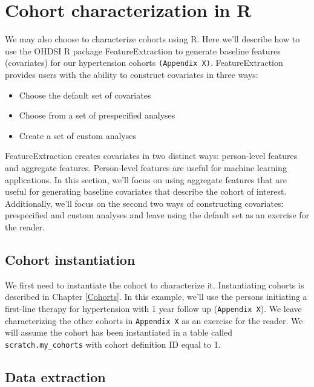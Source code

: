 \documentclass[11pt]{book}
\providecommand{\tightlist}{%
  \setlength{\itemsep}{0pt}\setlength{\parskip}{0pt}}
\theoremstyle{definition}
\theoremstyle{definition}
\theoremstyle{definition}
\theoremstyle{remark}
\begin{document}
\hypertarget{cohort-characterization-in-r}{%
\section{Cohort characterization in R}\label{cohort-characterization-in-r}}

We may also choose to characterize cohorts using R. Here we'll describe how to use the OHDSI R package FeatureExtraction to generate baseline features (covariates) for our hypertension cohorts \texttt{(Appendix\ X)}.
FeatureExtraction provides users with the ability to construct covariates in three ways:

\begin{itemize}
\tightlist
\item
  Choose the default set of covariates
\item
  Choose from a set of prespecified analyses
\item
  Create a set of custom analyses
\end{itemize}

FeatureExtraction creates covariates in two distinct ways: person-level features and aggregate features. Person-level features are useful for machine learning applications. In this section, we'll focus on using aggregate features that are useful for generating baseline covariates that describe the cohort of interest. Additionally, we'll focus on the second two ways of constructing covariates: prespecified and custom analyses and leave using the default set as an exercise for the reader.

\hypertarget{cohort-instantiation}{%
\subsection{Cohort instantiation}\label{cohort-instantiation}}

We first need to instantiate the cohort to characterize it. Instantiating cohorts is described in Chapter \ref{Cohorts}. In this example, we'll use the persons initiating a first-line therapy for hypertension with 1 year follow up (\texttt{Appendix\ X}). We leave characterizing the other cohorts in \texttt{Appendix\ X} as an exercise for the reader. We will assume the cohort has been instantiated in a table called \texttt{scratch.my\_cohorts} with cohort definition ID equal to 1.

\hypertarget{data-extraction}{%
\subsection{Data extraction}\label{data-extraction}}
\end{document}
